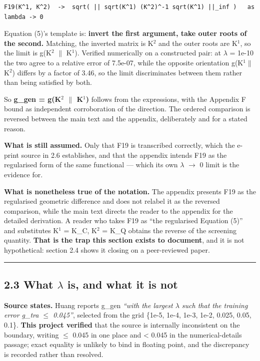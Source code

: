 \documentclass[
  10pt,
]{article}
\newcounter{none} %
\begin{document}
\begin{verbatim}
F19(K^1, K^2)  ->  sqrt( || sqrt(K^1) (K^2)^-1 sqrt(K^1) ||_inf )   as lambda -> 0
\end{verbatim}

Equation (5)'s template is: \textbf{invert the first argument, take
outer roots of the second.} Matching, the inverted matrix is K\(^{2}\)
and the outer roots are K\(^{1}\), so the limit is g(K\(^{2}\) \(\|\)
K\(^{1}\)). Verified numerically on a constructed pair: at \(\lambda\) =
1e-10 the two agree to a relative error of 7.5e-07, while the opposite
orientation g(K\(^{1}\)\(\|\)K\(^{2}\)) differs by a factor of 3.46, so
the limit discriminates between them rather than being satisfied by
both.

So \textbf{g\_gen = g(K\(^{2}\) \(\|\) K\(^{1}\))} follows from the
expressions, with the Appendix F bound as independent corroboration of
the direction. The ordered comparison is reversed between the main text
and the appendix, deliberately and for a stated reason.

\textbf{What is still assumed.} Only that F19 is transcribed correctly,
which the e-print source in 2.6 establishes, and that the appendix
intends F19 as the regularised form of the same functional --- which its
own \(\lambda\) \(\to\) 0 limit is the evidence for.

\textbf{What is nonetheless true of the notation.} The appendix presents
F19 as the regularised geometric difference and does not relabel it as
the reversed comparison, while the main text directs the reader to the
appendix for the detailed derivation. A reader who takes F19 as ``the
regularised Equation (5)'' and substitutes K\(^{1}\) = K\_C, K\(^{2}\) =
K\_Q obtains the reverse of the screening quantity. \textbf{That is the
trap this section exists to document}, and it is not hypothetical:
section 2.4 shows it closing on a peer-reviewed paper.

\begin{center}\rule{0.5\linewidth}{0.5pt}\end{center}

\subsection{\texorpdfstring{2.3 What \(\lambda\) is, and what it is
not}{2.3 What \textbackslash lambda is, and what it is not}}\label{what-lambda-is-and-what-it-is-not}

\textbf{Source states.} Huang reports g\_gen \emph{``with the largest
\(\lambda\) such that the training error g\_tra \(\le\) 0.045''},
selected from the grid \{1e-5, 1e-4, 1e-3, 1e-2, 0.025, 0.05, 0.1\}.
\textbf{This project verified} that the source is internally
inconsistent on the boundary, writing \(\le\) 0.045 in one place and
\textless{} 0.045 in the numerical-details passage; exact equality is
unlikely to bind in floating point, and the discrepancy is recorded
rather than resolved.
\end{document}
